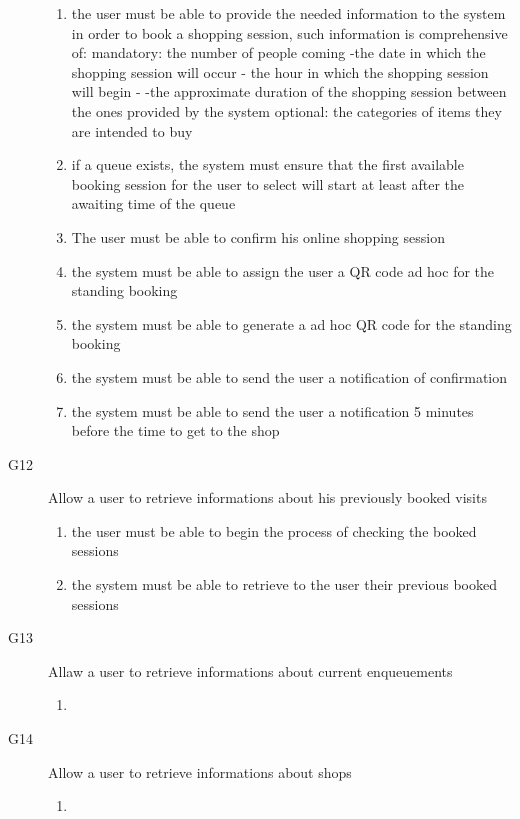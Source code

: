 \begin{description}
\begin{enumerate}[resume*]
            \item the user must be able to provide the needed information to the system in order to book a shopping session, such information is comprehensive of:
            mandatory:
            the number of people coming
            -the date in which the shopping session will occur
            - the hour in which the shopping session will begin -
            -the approximate duration of the shopping session between the ones provided by the system
            optional:
            the categories of items they are intended to buy
            \item if a queue exists, the system must ensure that the first available booking session for the user to select will start at least after the awaiting time of the queue
            \item The user must be able to confirm his online shopping session
            \item the system must be able to assign the user a QR code ad hoc for the standing booking 
            \item the system must be able to generate a ad hoc QR code for the standing booking 
            \item the system must be able to send the user a notification of confirmation
            \item the system must be able to send the user a notification 5 minutes before the time to get to the shop 
        \end{enumerate}
    \item [G12] Allow a user to retrieve informations about his previously booked visits
        \begin{enumerate}[resume*]
            \item the user must be able to begin the process of checking the booked sessions
            \item the system must be able to retrieve to the user their previous booked sessions
        \end{enumerate}
    \item [G13] Allaw a user to retrieve informations about current enqueuements
        \begin{enumerate}[resume*]
            \item 
        \end{enumerate}
    \item [G14] Allow a user to retrieve informations about shops
        \begin{enumerate}[resume*]
            \item 

\end{enumerate}
\end{description}
